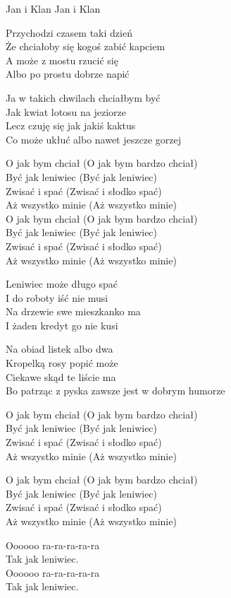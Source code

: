 {Jan i Klan}
{Jan i Klan}
\begin{text}
    \hfill\break
Przychodzi czasem taki dzień\\
Że chciałoby się kogoś zabić kapciem\\
A może z mostu rzucić się\\
Albo po prostu dobrze napić

Ja w takich chwilach chciałbym być\\
Jak kwiat lotosu na jeziorze\\
Lecz czuję się jak jakiś kaktus\\
Co może ukłuć albo nawet jeszcze gorzej

O jak bym chciał (O jak bym bardzo chciał)\\
Być jak leniwiec (Być jak leniwiec)\\
Zwisać i spać (Zwisać i słodko spać)\\
Aż wszystko minie (Aż wszystko minie)\\

O jak bym chciał (O jak bym bardzo chciał)\\
Być jak leniwiec (Być jak leniwiec)\\
Zwisać i spać (Zwisać i słodko spać)\\
Aż wszystko minie (Aż wszystko minie)

Leniwiec może długo spać\\
I do roboty iść nie musi\\
Na drzewie swe mieszkanko ma\\
I żaden kredyt go nie kusi

Na obiad listek albo dwa\\
Kropelką rosy popić może\\
Ciekawe skąd te liście ma\\
Bo patrząc z pyska zawsze jest w dobrym humorze

O jak bym chciał (O jak bym bardzo chciał)\\
Być jak leniwiec (Być jak leniwiec)\\
Zwisać i spać (Zwisać i słodko spać)\\
Aż wszystko minie (Aż wszystko minie)

O jak bym chciał (O jak bym bardzo chciał)\\
Być jak leniwiec (Być jak leniwiec)\\
Zwisać i spać (Zwisać i słodko spać)\\
Aż wszystko minie (Aż wszystko minie)

Oooooo ra-ra-ra-ra-ra\\
Tak jak leniwiec.\\
Oooooo ra-ra-ra-ra-ra\\
Tak jak leniwiec.


\end{text}
